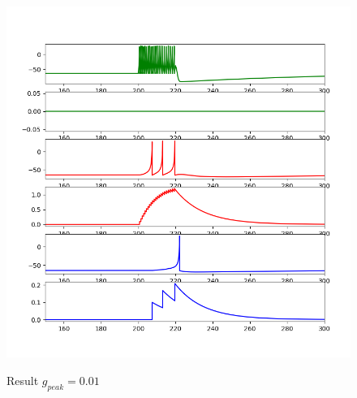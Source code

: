 \documentclass[12pt]{article}
\begin{document}
 \begin{figure}[H]
  \centering
  \includegraphics[width=.8\textwidth]{h1_p1_001.png} %
  \label{img} %
  \caption{Result $g_{peak}=0.01$}
\end{figure}
\end{document}
